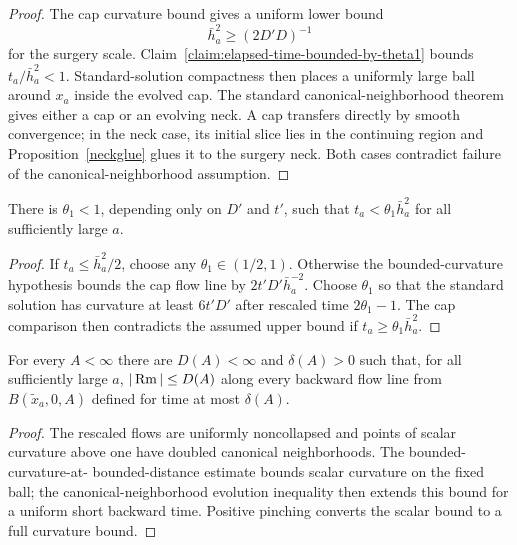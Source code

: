 \begin{proof}
\sketch

The cap curvature bound gives a uniform lower bound
\begin{equation}
\label{hequat}
  \bar h_a^2\geq(2D'D)^{-1}
\end{equation}
for the surgery scale. Claim~\ref{claim:elapsed-time-bounded-by-theta1} bounds
$t_a/\bar h_a^2<1$. Standard-solution compactness then places a uniformly large
ball around $x_a$ inside the evolved cap. The standard canonical-neighborhood
theorem gives either a cap or an evolving neck. A cap transfers directly by
smooth convergence; in the neck case, its initial slice lies in the continuing
region and Proposition~\ref{neckglue} glues it to the surgery neck. Both cases
contradict failure of the canonical-neighborhood assumption.
\end{proof}

\begin{claim}
\label{claim:elapsed-time-bounded-by-theta1}
There is $\theta_1<1$, depending only on $D'$ and $t'$, such that
$t_a<\theta_1\bar h_a^2$ for all sufficiently large $a$.
\end{claim}

\begin{proof}
\sketch
{}
If $t_a\leq\bar h_a^2/2$, choose any $\theta_1\in(1/2,1)$. Otherwise the
bounded-curvature hypothesis bounds the cap flow line by
$2t'D'\bar h_a^{-2}$. Choose $\theta_1$ so that the standard solution has
curvature at least $6t'D'$ after rescaled time $2\theta_1-1$. The cap comparison
then contradicts the assumed upper bound if $t_a\geq\theta_1\bar h_a^2$.
\end{proof}

\begin{claim}
\label{claim:curvature-bound-along-backward-flow-lines}
\label{D(A)delta(A)}
For every $A<\infty$ there are $D(A)<\infty$ and $\delta(A)>0$ such that,
for all sufficiently large $a$, $|\operatorname{Rm}|\leq D(A)$ along every backward flow line
from $B(\widetilde x_a,0,A)$ defined for time at most $\delta(A)$.
\end{claim}

\begin{proof}
\sketch
{}
The rescaled flows are uniformly noncollapsed and points of scalar curvature
above one have doubled canonical neighborhoods. The bounded-curvature-at-
bounded-distance estimate bounds scalar curvature on the fixed ball; the
canonical-neighborhood evolution inequality then extends this bound for a
uniform short backward time. Positive pinching converts the scalar bound to a
full curvature bound.
\end{proof}

